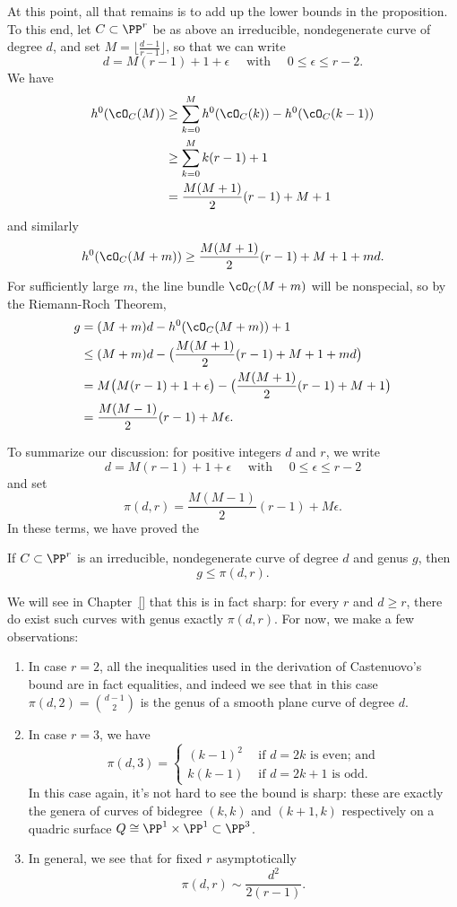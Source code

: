At this point, all that remains is to add up the lower bounds in the proposition. To this end, let $C \subset \PP^r$ be as above an irreducible, nondegenerate curve of degree $d$, and set $M = \lfloor{\frac{d-1}{r-1}}\rfloor$, so that we can write
$$
d = M(r-1) + 1 + \epsilon \quad \text{ with } \quad 0 \leq \epsilon \leq r-2.
$$
We have 
\begin{align*}
h^0(\cO_C(M)) &\geq \sum_{k=0}^M h^0(\cO_C(k)) - h^0(\cO_C(k-1)) \\
&\geq  \sum_{k=0}^M k(r-1)+1 \\
&= \frac{M(M+1)}{2}(r-1) + M + 1
\end{align*}
and similarly
$$
h^0(\cO_C(M+m)) \geq \frac{M(M+1)}{2}(r-1) + M + 1 + md.
$$
For sufficiently large $m$, the line bundle $\cO_C(M+m)$ will be nonspecial, so by the Riemann-Roch Theorem,
\begin{align*}
g &= (M+m)d - h^0(\cO_C(M+m)) + 1 \\
&\leq (M+m)d - \bigl(  \frac{M(M+1)}{2}(r-1) + M + 1 + md \bigr) \\
& = M\bigl( M(r-1) + 1 + \epsilon \bigr) - \bigl(  \frac{M(M+1)}{2}(r-1) + M + 1 \bigr) \\
&= \frac{M(M-1)}{2}(r-1) + M\epsilon.
\end{align*}

To summarize our discussion: for positive integers $d$ and $r$, we write
$$
 d = M(r-1) + 1 + \epsilon \quad \text{ with } \quad 0 \leq \epsilon \leq r-2
$$
and set
$$
\pi(d,r) = \frac{M(M-1)}{2}(r-1) + M\epsilon.
$$
In these terms, we have proved the

\begin{theorem}
If $C \subset \PP^r$ is an irreducible, nondegenerate curve of degree $d$ and genus $g$, then
$$
g \leq \pi(d,r).
$$
\end{theorem}

We will see in Chapter~\ref{} that this is in fact sharp: for every $r$ and $d \geq r$, there do exist such curves with genus exactly $\pi(d,r)$. For now, we make a few observations:

\begin{enumerate}
\item In case $r=2$, all the inequalities used in the derivation of Castenuovo's bound are in fact equalities, and indeed we see that in this case $\pi(d,2) = \binom{d-1}{2}$ is the genus of a smooth plane curve of degree $d$.

\item In case $r=3$, we have
$$
\pi(d,3) =
\begin{cases}
\left( k - 1 \right)^2 &\text{ if $d=2k$ is even; and} \\
k(k-1) &\text{ if $d=2k+1$ is odd.}
\end{cases}
$$
In this case again, it's not hard to see the bound is sharp: these are exactly the genera of curves of bidegree $(k,k)$ and $(k+1,k)$ respectively on a quadric surface $Q \cong \PP^1 \times \PP^1 \subset \PP^3$.
\item In general, we see that for fixed $r$ asymptotically
$$
\pi(d,r) \sim \frac{d^2}{2(r-1)}.
$$
\end{enumerate}


